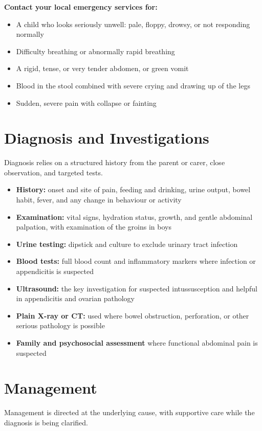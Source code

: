 \textbf{Contact your local emergency services for:}
\begin{itemize}
    \item A child who looks seriously unwell: pale, floppy, drowsy, or not responding normally
    \item Difficulty breathing or abnormally rapid breathing
    \item A rigid, tense, or very tender abdomen, or green vomit
    \item Blood in the stool combined with severe crying and drawing up of the legs
    \item Sudden, severe pain with collapse or fainting
\end{itemize}

\section*{Diagnosis and Investigations}
Diagnosis relies on a structured history from the parent or carer, close observation, and targeted tests.

\begin{itemize}
    \item \textbf{History:} onset and site of pain, feeding and drinking, urine output, bowel habit, fever, and any change in behaviour or activity
    \item \textbf{Examination:} vital signs, hydration status, growth, and gentle abdominal palpation, with examination of the groins in boys
    \item \textbf{Urine testing:} dipstick and culture to exclude urinary tract infection
    \item \textbf{Blood tests:} full blood count and inflammatory markers where infection or appendicitis is suspected
    \item \textbf{Ultrasound:} the key investigation for suspected intussusception and helpful in appendicitis and ovarian pathology
    \item \textbf{Plain X-ray or CT:} used where bowel obstruction, perforation, or other serious pathology is possible
    \item \textbf{Family and psychosocial assessment} where functional abdominal pain is suspected
\end{itemize}

\section*{Management}
Management is directed at the underlying cause, with supportive care while the diagnosis is being clarified.

